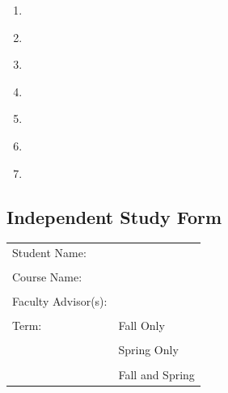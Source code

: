 \vspace{.25cm}
\begin{enumerate}
  \item \underline{\hspace{9cm}}
  \item \underline{\hspace{9cm}}
    \item \underline{\hspace{9cm}}
  \item \underline{\hspace{9cm}}
  \item \underline{\hspace{9cm}}
  \item \underline{\hspace{9cm}}
  \item \underline{\hspace{9cm}}            
\end{enumerate}






















\newpage


\subsection{Independent Study Form}

\vspace{1cm}



\begin{tabular}{ll}
Student Name: & \underline{\hspace{7cm}}\\
&\\
Course Name:  & \underline{\hspace{7cm}}\\
&\\
Faculty Advisor(s):&  \underline{\hspace{7cm}}\\
&\\
Term: & Fall Only\\
&\\
& Spring Only\\
&\\
& Fall and Spring
\end{tabular}\\












